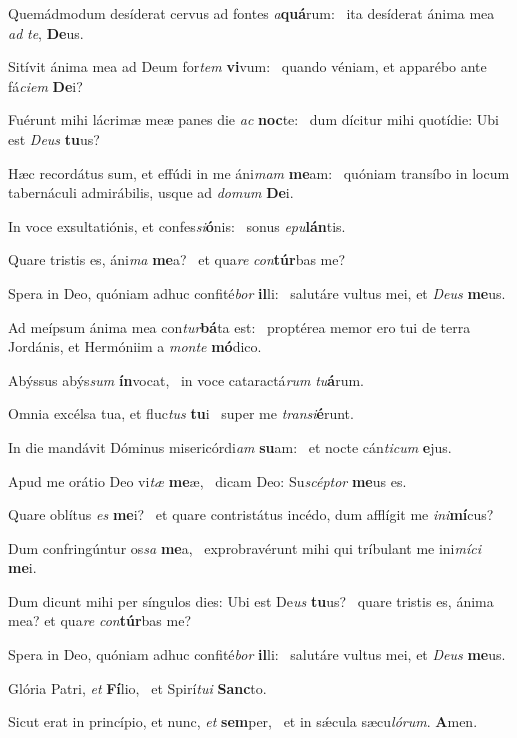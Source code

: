 \item Quemádmodum desíderat cervus ad fontes \textit{a}\textbf{quá}rum:~\psstar{} ita desíderat ánima mea \textit{ad} \textit{te}, \textbf{De}us.
\item Sitívit ánima mea ad Deum for\textit{tem} \textbf{vi}vum:~\psstar{} quando véniam, et apparébo ante fá\textit{ciem} \textbf{De}i?
\item Fuérunt mihi lácrimæ meæ panes die \textit{ac} \textbf{noc}te:~\psstar{} dum dícitur mihi quotídie: Ubi est \textit{Deus} \textbf{tu}us?
\item Hæc recordátus sum, et effúdi in me áni\textit{mam} \textbf{me}am:~\psstar{} quóniam transíbo in locum tabernáculi admirábilis, usque ad \textit{domum} \textbf{De}i.
\item In voce exsultatiónis, et confes\textit{si}\textbf{ó}nis:~\psstar{} sonus \textit{epu}\textbf{lán}tis.
\item Quare tristis es, áni\textit{ma} \textbf{me}a?~\psstar{} et qua\textit{re} \textit{con}\textbf{túr}bas me?
\item Spera in Deo, quóniam adhuc confité\textit{bor} \textbf{il}li:~\psstar{} salutáre vultus mei, et \textit{Deus} \textbf{me}us.
\item Ad meípsum ánima mea con\textit{tur}\textbf{bá}ta est:~\psstar{} proptérea memor ero tui de terra Jordánis, et Hermóniim a \textit{monte} \textbf{mó}dico.
\item Abýssus abýs\textit{sum} \textbf{ín}vocat,~\psstar{} in voce cataractá\textit{rum} \textit{tu}\textbf{á}rum.
\item Omnia excélsa tua, et fluc\textit{tus} \textbf{tu}i~\psstar{} super me \textit{transi}\textbf{é}runt.
\item In die mandávit Dóminus misericórdi\textit{am} \textbf{su}am:~\psstar{} et nocte cán\textit{ticum} \textbf{e}jus.
\item Apud me orátio Deo vi\textit{tæ} \textbf{me}æ,~\psstar{} dicam Deo: Su\textit{scéptor} \textbf{me}us es.
\item Quare oblítus \textit{es} \textbf{me}i?~\psstar{} et quare contristátus incédo, dum afflígit me \textit{ini}\textbf{mí}cus?
\item Dum confringúntur os\textit{sa} \textbf{me}a,~\psstar{} exprobravérunt mihi qui tríbulant me ini\textit{míci} \textbf{me}i.
\item Dum dicunt mihi per síngulos dies: Ubi est De\textit{us} \textbf{tu}us?~\psstar{} quare tristis es, ánima mea? et qua\textit{re} \textit{con}\textbf{túr}bas me?
\item Spera in Deo, quóniam adhuc confité\textit{bor} \textbf{il}li:~\psstar{} salutáre vultus mei, et \textit{Deus} \textbf{me}us.
\item Glória Patri, \textit{et} \textbf{Fí}lio,~\psstar{} et Spirí\textit{tui} \textbf{Sanc}to.
\item Sicut erat in princípio, et nunc, \textit{et} \textbf{sem}per,~\psstar{} et in sǽcula sæcu\textit{lórum}. \textbf{A}men.